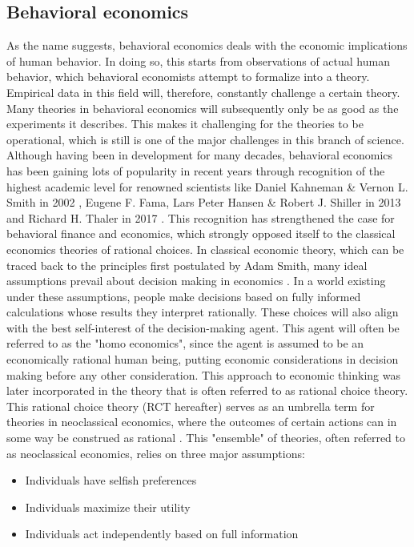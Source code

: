 \subsection{\large{Behavioral economics}}
As the name suggests, behavioral economics deals with the economic implications of human behavior. In doing so, this starts from observations of actual human behavior, which behavioral economists attempt to formalize into a theory. Empirical data in this field will, therefore, constantly challenge a certain theory. Many theories in behavioral economics will subsequently only be as good as the experiments it describes. This makes it challenging for the theories to be operational, which is still is one of the major challenges in this branch of science. Although having been in development for many decades, behavioral economics has been gaining lots of popularity in recent years through recognition of the highest academic level for renowned scientists like Daniel Kahneman \& Vernon L. Smith in 2002 \cite{NobelKahne}, Eugene F. Fama, Lars Peter Hansen \& Robert J. Shiller in 2013 \cite{Nobelshiller} and Richard H. Thaler in 2017 \cite{Nobelthaler}. This recognition has strengthened the case for behavioral finance and economics, which strongly opposed itself to the classical economics theories of rational choices.
\newline \newline \noindent
In classical economic theory, which can be traced back to the principles first postulated by Adam Smith, many ideal assumptions prevail about decision making in economics \cite{adamsmith}. In a world existing under these assumptions, people make decisions based on fully informed calculations whose results they interpret rationally. These choices will also align with the best self-interest of the decision-making agent. This agent will often be referred to as the "homo economics", since the agent is assumed to be an economically rational human being, putting economic considerations in decision making before any other consideration. This approach to economic thinking was later incorporated in the theory that is often referred to as rational choice theory. This rational choice theory (RCT hereafter) serves as an umbrella term for theories in neoclassical economics, where the outcomes of certain actions can in some way be construed as rational \cite{RCT}. This "ensemble" of theories, often referred to as neoclassical economics, relies on three major assumptions:
\begin{itemize}
  \item Individuals have selfish preferences
  \item Individuals maximize their utility
  \item Individuals act independently based on full information
\end{itemize}
